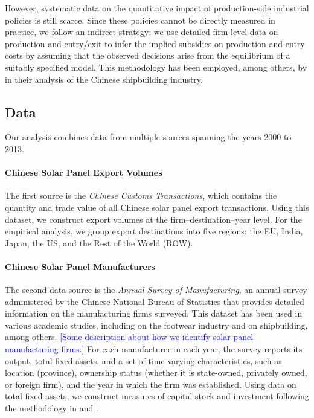 \documentclass[12pt, letter]{article}
\begin{document}
However, systematic data on the quantitative impact of production-side industrial policies is still scarce. Since these policies cannot be directly measured in practice, we follow an indirect strategy: we use detailed firm-level data on production and entry/exit to infer the implied subsidies on production and entry costs by assuming that the observed decisions arise from the equilibrium of a suitably specified model. This methodology has been employed, among others, by \citet{barwick2025industrial} in their analysis of the Chinese shipbuilding industry.


\subsection{Data}
\label{subsec:inst_data}

Our analysis combines data from multiple sources spanning the years 2000 to 2013. 

\paragraph{Chinese Solar Panel Export Volumes}
The first source is the \textit{Chinese Customs Transactions}, which contains the quantity and trade value of all Chinese solar panel export transactions. Using this dataset, we construct export volumes at the firm–destination–year level. For the empirical analysis, we group export destinations into five regions: the EU, India, Japan, the US, and the Rest of the World (ROW).

\paragraph{Chinese Solar Panel Manufacturers}
The second data source is the \textit{Annual Survey of Manufacturing}, an annual survey administered by the Chinese National Bureau of Statistics that provides detailed information on the manufacturing firms surveyed. This dataset has been used in various academic studies, including \citet{roberts2018role} on the footwear industry and \citet{barwick2025industrial} on shipbuilding, among others. \textcolor{blue}{[Some description about how we identify solar panel manufacturing firms.]} For each manufacturer in each year, the survey reports its output, total fixed assets, and a set of time-varying characteristics, such as location (province), ownership status (whether it is state-owned, privately owned, or foreign firm), and the year in which the firm was established.  Using data on total fixed assets, we construct measures of capital stock and investment following the methodology in \citet{brandt2012creative} and \citet{barwick2025industrial}.
\end{document}
